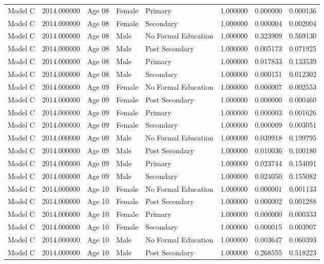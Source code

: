 \begin{table}[ht]
\begin{tabular}{lrlllrrr}
Model C & 2014.000000 & Age 08 & Female & Primary & 1.000000 & 0.000000 & 0.000136 \\
Model C & 2014.000000 & Age 08 & Female & Secondary & 1.000000 & 0.000004 & 0.002004 \\
Model C & 2014.000000 & Age 08 & Male & No Formal Education & 1.000000 & 0.323909 & 0.569130 \\
Model C & 2014.000000 & Age 08 & Male & Post Secondary & 1.000000 & 0.005173 & 0.071925 \\
Model C & 2014.000000 & Age 08 & Male & Primary & 1.000000 & 0.017833 & 0.133539 \\
Model C & 2014.000000 & Age 08 & Male & Secondary & 1.000000 & 0.000151 & 0.012302 \\
Model C & 2014.000000 & Age 09 & Female & No Formal Education & 1.000000 & 0.000007 & 0.002553 \\
Model C & 2014.000000 & Age 09 & Female & Post Secondary & 1.000000 & 0.000000 & 0.000460 \\
Model C & 2014.000000 & Age 09 & Female & Primary & 1.000000 & 0.000003 & 0.001626 \\
Model C & 2014.000000 & Age 09 & Female & Secondary & 1.000000 & 0.000009 & 0.003051 \\
Model C & 2014.000000 & Age 09 & Male & No Formal Education & 1.000000 & 0.039918 & 0.199795 \\
Model C & 2014.000000 & Age 09 & Male & Post Secondary & 1.000000 & 0.010036 & 0.100180 \\
Model C & 2014.000000 & Age 09 & Male & Primary & 1.000000 & 0.023744 & 0.154091 \\
Model C & 2014.000000 & Age 09 & Male & Secondary & 1.000000 & 0.024050 & 0.155082 \\
Model C & 2014.000000 & Age 10 & Female & No Formal Education & 1.000000 & 0.000001 & 0.001133 \\
Model C & 2014.000000 & Age 10 & Female & Post Secondary & 1.000000 & 0.000002 & 0.001288 \\
Model C & 2014.000000 & Age 10 & Female & Primary & 1.000000 & 0.000000 & 0.000333 \\
Model C & 2014.000000 & Age 10 & Female & Secondary & 1.000000 & 0.000015 & 0.003907 \\
Model C & 2014.000000 & Age 10 & Male & No Formal Education & 1.000000 & 0.003647 & 0.060393 \\
Model C & 2014.000000 & Age 10 & Male & Post Secondary & 1.000000 & 0.268555 & 0.518223 \\

\end{tabular}
\end{table}

